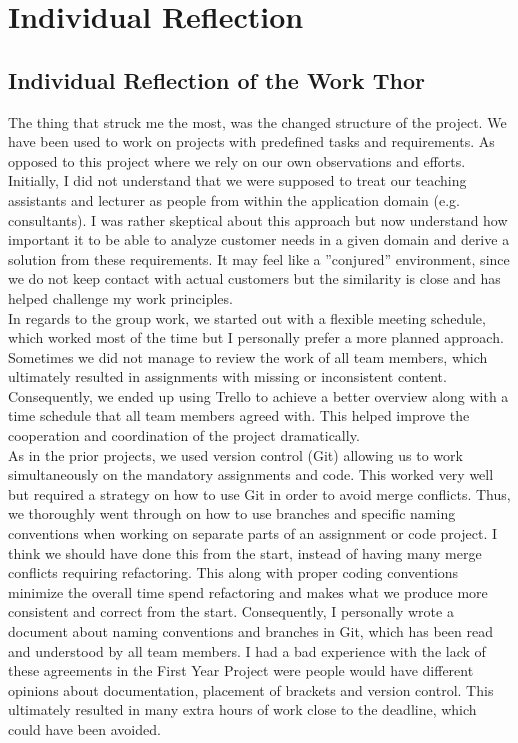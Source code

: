 \section{Individual Reflection}

\subsection{Individual Reflection of the Work Thor}
The thing that struck me the most, was the changed structure of the project. We have been used to work on projects with predefined tasks and requirements. As opposed to this project where we rely on our own observations and efforts. Initially, I did not understand that we were supposed to treat our teaching assistants and lecturer as people from within the application domain (e.g. consultants). I was rather skeptical about this approach but now understand how important it to be able to analyze customer needs in a given domain and derive a solution from these requirements. It may feel like a ”conjured” environment, since we do not keep contact with actual customers but the similarity is close and has helped challenge my work principles. 
\\
In regards to the group work, we started out with a flexible meeting schedule, which worked most of the time but I personally prefer a more planned approach. Sometimes we did not manage to review the work of all team members, which ultimately resulted in assignments with missing or inconsistent content. Consequently, we ended up using Trello to achieve a better overview along with a time schedule that all team members agreed with. This helped improve the cooperation and coordination of the project dramatically. 
\\
As in the prior projects, we used version control (Git) allowing us to work simultaneously on the mandatory assignments and code. This worked very well but required a strategy on how to use Git in order to avoid merge conflicts. Thus, we thoroughly went through on how to use branches and specific naming conventions when working on separate parts of an assignment or code project. I think we should have done this from the start, instead of having many merge conflicts requiring refactoring. This along with proper coding conventions minimize the overall time spend refactoring and makes what we produce more consistent and correct from the start. Consequently, I personally wrote a document about naming conventions and branches in Git, which has been read and understood by all team members. I had a bad experience with the lack of these agreements in the First Year Project were people would have different opinions about documentation, placement of brackets and version control. This ultimately resulted in many extra hours of work close to the deadline, which could have been avoided. 
